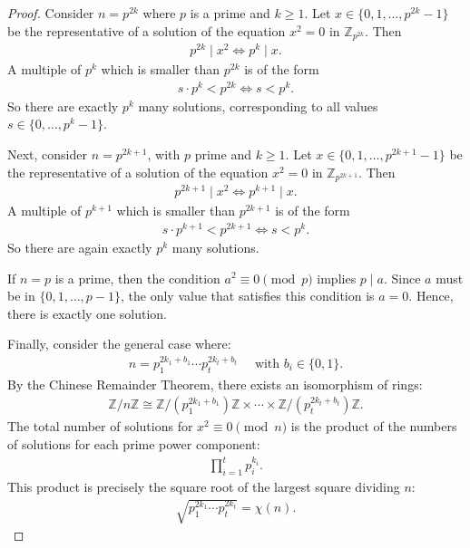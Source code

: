 \documentclass[10pt]{article}
\theoremstyle{plain}
\newcommand{\Z}{\mathbb{Z}}
\begin{document}
\begin{proof}
Consider $n = p^{2k}$ where $p$ is a prime and $k \geq 1$.
Let $x \in \{0, 1, \dots, p^{2k} - 1\}$ be the representative of a solution of the equation $x^2 = 0$ in $\mathbb Z_{p^{2k}}$.
Then
\begin{align*}
   p^{2k} \mid x^2 \iff p^k \mid x .
\end{align*}
A multiple of $p^k$ which is smaller than $p^{2k}$ is of the form
\begin{align*}
s \cdot p^k < p^{2k} \iff s < p^k.
\end{align*}
So there are exactly $p^k$ many solutions, corresponding to all values $s \in \{0, \dots, p^k-1\}$.

Next, consider $n = p^{2k + 1}$, with $p$ prime and $k \geq 1$. Let $x \in \{0, 1, \dots, p^{2k + 1} - 1\}$ be the representative of a solution of the equation $x^2 = 0$ in $\mathbb Z_{p^{2k + 1}}$.
Then
\begin{align*}
    p^{2k+1} \mid x^2 \iff p^{k + 1} \mid x .
\end{align*}
A multiple of $p^{k + 1}$ which is smaller than $p^{2k + 1}$ is of the form
\begin{align*}
s \cdot p^{k + 1} < p^{2k+1} \iff s < p^k .
\end{align*}
So there are again exactly $p^k$ many solutions.

If $n = p$ is a prime, then the condition $a^2 \equiv 0 \pmod{p}$ implies $p \mid a$. Since $a$ must be in $\{0, 1, \dots, p - 1\}$, the only value that satisfies this condition is $a = 0$. Hence, there is exactly one solution.

Finally, consider the general case where:
\begin{align*}
n = p_1^{2k_1 + b_1} \cdots p_t^{2k_t + b_t} \quad \text{ with } b_i \in \{0, 1\}.
\end{align*}
By the Chinese Remainder Theorem, there exists an isomorphism of rings:
\begin{align*}
\Z/n\Z \cong \Z/(p_1^{2k_1 + b_1})\Z \times \cdots \times \Z/(p_t^{2k_t + b_t})\Z.
\end{align*}
The total number of solutions for $x^2 \equiv 0 \pmod{n}$ is the product of the numbers of solutions for each prime power component:
\begin{align*}
\prod_{i=1}^t p_i^{k_i}.
\end{align*}
This product is precisely the square root of the largest square dividing $n$:
\begin{align*}
\sqrt{p_1^{2k_1} \cdots p_t^{2k_t}} = \chi(n).
\end{align*}
\end{proof}
\end{document}
